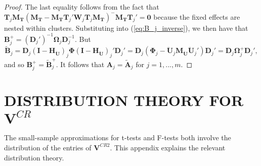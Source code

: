 \documentclass[12pt]{article}
\newcommand{\bm}{\mathbf}
\newcommand{\bs}{\boldsymbol}
\begin{document}
\begin{proof}
The last equality follows from the fact that $\bm{T}_j \bm{M_T}\left(\bm{M_T} - \bm{M_T}\bm{T}_j' \bm{W}_j \bm{T}_j\bm{M_T}\right)^{-} \bm{M_T} \bm{T}_j' = \bm{0}$ because the fixed effects are nested within clusters. 
Substituting into (\ref{eq:B_j_inverse}), we then have that $\bm{B}_j^+ = \left(\bm{D}_j'\right)^{-1} \bs\Omega_j \bm{D}_j^{-1}$. 
But \[
\bm{\tilde{B}}_j = \bm{D}_j \left(\bm{I} - \bm{H_{\ddot{U}}}\right)_j \bs\Phi \left(\bm{I} - \bm{H_{\ddot{U}}}\right)_j' \bm{D}_j' = \bm{D}_j \left(\bs\Phi_j - \bm{\ddot{U}}_j\bm{M_{\ddot{U}}} \bm{\ddot{U}}_j'\right) \bm{D}_j' = \bm{D}_j \bs\Omega_j^+ \bm{D}_j',
\]
and so $\bm{B}_j^+ = \bm{\tilde{B}}_j^+$. It follows that $\bm{A}_j = \bm{\tilde{A}}_j$ for $j = 1,...,m$. 
\end{proof}

\section{DISTRIBUTION THEORY FOR $\bm{V}^{CR}$}
\label{app:VCR_dist}

The small-sample approximations for t-tests and F-tests both involve the distribution of the entries of $\bm{V}^{CR2}$. This appendix explains the relevant distribution theory.

\end{document}
